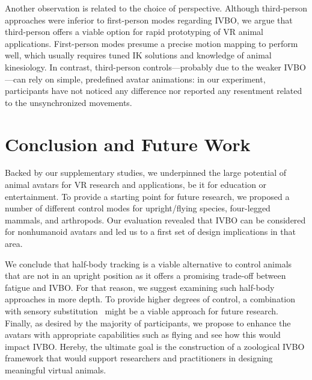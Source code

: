 \documentclass[conference]{IEEEtran}
\begin{document}
Another observation is related to the choice of perspective. Although third-person approaches were inferior to first-person modes regarding IVBO, we argue that third-person offers a viable option for rapid prototyping of VR animal applications. First-person modes presume a precise motion mapping to perform well, which usually requires tuned IK solutions and knowledge of animal kinesiology. In contrast,  third-person controls---probably due to the weaker IVBO---can rely on simple, predefined avatar animations: in our experiment, participants have not noticed any difference nor reported any resentment related to the unsynchronized movements.





\section{Conclusion and Future Work}

Backed by our supplementary studies, we underpinned the large potential of animal avatars for VR research and applications, be it for education or entertainment. To provide a starting point for future research, we proposed a number of different control modes for upright/flying species, four-legged mammals, and arthropods. Our evaluation revealed that IVBO can be considered for nonhumanoid avatars and led us to a first set of design implications in that area. 

We conclude that half-body tracking is a viable alternative to control animals that are not in an upright position as it offers a promising trade-off between fatigue and IVBO. For that reason, we suggest examining such half-body approaches in more depth. To provide higher degrees of control, a combination with sensory substitution~\cite{bach2003sensory} might be a viable approach for future research. Finally, as desired by the majority of participants, we propose to enhance the avatars with appropriate capabilities such as flying and see how this would impact IVBO. Hereby, the ultimate goal is the construction of a zoological IVBO framework that would support researchers and practitioners in designing meaningful virtual animals.
\end{document}
